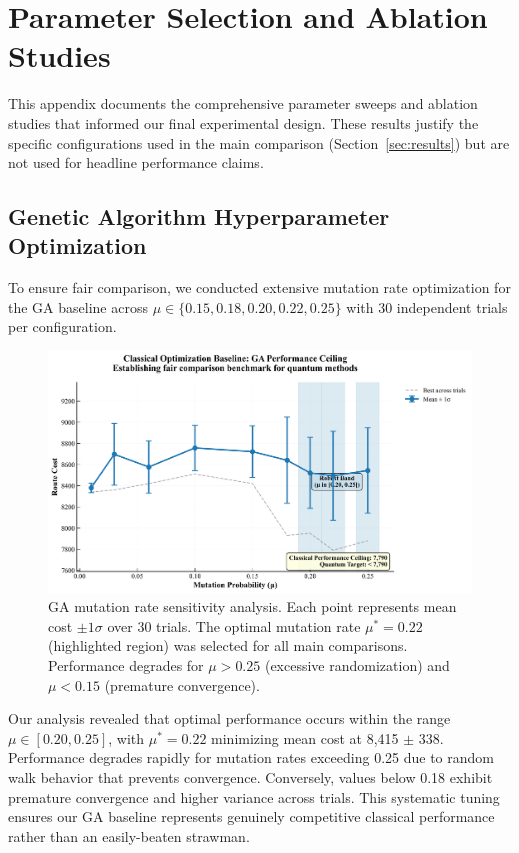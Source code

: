 \section{Parameter Selection and Ablation Studies}
\label{sec:appendix_parameters}

This appendix documents the comprehensive parameter sweeps and ablation studies that informed our final experimental design. These results justify the specific configurations used in the main comparison (Section~\ref{sec:results}) but are not used for headline performance claims.

\subsection{Genetic Algorithm Hyperparameter Optimization}
\label{sec:appendix_ga_tuning}

To ensure fair comparison, we conducted extensive mutation rate optimization for the GA baseline across $\mu \in \{0.15, 0.18, 0.20, 0.22, 0.25\}$ with 30 independent trials per configuration.

\begin{figure}[h]
  \centering
  \includegraphics[width=0.8\linewidth]{figures/01_ga_mutation_sweep.png}
  \caption{GA mutation rate sensitivity analysis. Each point represents mean cost $\pm 1\sigma$ over 30 trials. The optimal mutation rate $\mu^* = 0.22$ (highlighted region) was selected for all main comparisons. Performance degrades for $\mu > 0.25$ (excessive randomization) and $\mu < 0.15$ (premature convergence).}
  \label{fig:ga_mutation_sweep}
\end{figure}

Our analysis revealed that optimal performance occurs within the range $\mu \in [0.20, 0.25]$, with $\mu^* = 0.22$ minimizing mean cost at 8,415 $\pm$ 338. Performance degrades rapidly for mutation rates exceeding 0.25 due to random walk behavior that prevents convergence. Conversely, values below 0.18 exhibit premature convergence and higher variance across trials. This systematic tuning ensures our GA baseline represents genuinely competitive classical performance rather than an easily-beaten strawman.

